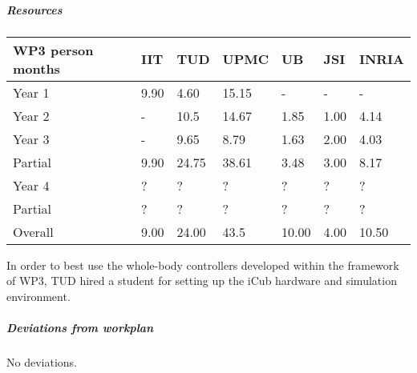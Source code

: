 
\subparagraph{Resources}

\begin{center}
\begin{tabular}{|C{1.5cm}|C{1.5cm}|C{1.5cm}|C{2cm}|C{2cm}|C{2cm}|C{2cm}|}
\hline
\footnotesize \textbf{WP3 person months} & \footnotesize \textbf{IIT}&\footnotesize \textbf{TUD}&\footnotesize \textbf{UPMC}& \footnotesize \textbf{UB} &\footnotesize \textbf{JSI} &\footnotesize \textbf{INRIA} \\ \hline
\footnotesize Year 1  &  9.90 & 4.60  & 15.15 & -    & -    &  -   \\  \hline
\footnotesize Year 2  &  -    & 10.5  & 14.67 & 1.85 & 1.00 & 4.14  \\  \hline
\footnotesize Year 3  &  -    & 9.65  & 8.79  & 1.63 & 2.00 & 4.03 \\  \hline
\footnotesize Partial &  9.90 & 24.75 & 38.61 & 3.48 & 3.00 & 8.17 \\  \hline
\footnotesize Year 4  & ?     & ?    & ?    & ?    & ?    & ?    \\   	\hline
\footnotesize Partial & ?     & ?    & ?    & ?    & ?    & ?    \\
\hline \hline
\footnotesize Overall &  9.00 & 24.00 & 43.5 & 10.00 & 4.00 & 10.50 \\ \hline
\end{tabular}
\end{center}

In order to best use the whole-body controllers developed within the framework of WP3, TUD hired a student for setting up the iCub hardware and simulation environment.

\subparagraph*{Deviations from workplan}

No deviations.


